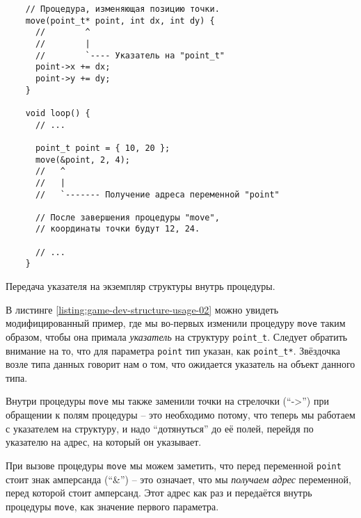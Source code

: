 \documentclass[../sparc.tex]{subfiles}
\begin{document}
\begin{listing}[H]
  \begin{verbatim}
    // Процедура, изменяющая позицию точки.
    move(point_t* point, int dx, int dy) {
      //        ^
      //        |
      //        `---- Указатель на "point_t"
      point->x += dx;
      point->y += dy;
    }

    void loop() {
      // ...

      point_t point = { 10, 20 };
      move(&point, 2, 4);
      //   ^
      //   |
      //   `------- Получение адреса переменной "point"

      // После завершения процедуры "move",
      // координаты точки будут 12, 24.

      // ...
    }
  \end{verbatim}
  \caption{Передача указателя на экземпляр структуры внутрь процедуры.}
  \label{listing:game-dev-structure-usage-02}
\end{listing}

В листинге \ref{listing:game-dev-structure-usage-02} можно увидеть
модифицированный пример, где мы во-первых изменили процедуру
\texttt{move} таким образом, чтобы она примала \emph{указатель} на
структуру \texttt{point_t}.  Следует обратить внимание на то, что для
параметра \texttt{point} тип указан, как \texttt{point_t*}.
Звёздочка возле типа данных говорит нам о том, что ожидается указатель на объект
данного типа.

Внутри процедуры \texttt{move} мы также заменили точки на стрелочки
(``->'') при обращении к полям процедуры -- это необходимо потому, что теперь мы
работаем с указателем на структуру, и надо ``дотянуться'' до её полей, перейдя
по указателю на адрес, на который он указывает.

При вызове процедуры \texttt{move} мы можем заметить, что перед
переменной \texttt{point} стоит знак амперсанда (``\&'') -- это
означает, что мы \emph{получаем адрес} переменной, перед которой стоит
амперсанд.  Этот адрес как раз и передаётся внутрь процедуры
\texttt{move}, как значение первого параметра.
\end{document}
